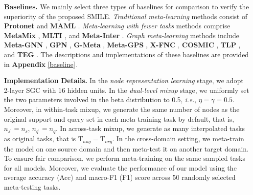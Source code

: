 \noindent \textbf{Baselines.} 
We mainly select three types of baselines for comparison to verify the superiority of the proposed SMILE. \textit{Traditional meta-learning} methods consist of \textbf{Protonet} \cite{snell2017prototypical} and \textbf{MAML} \cite{finn2017model}. \textit{Meta-learning with fewer tasks} methods comprise \textbf{MetaMix} \cite{yao2021improving}, \textbf{MLTI} \cite{yao2021meta}, and \textbf{Meta-Inter} \cite{lee2022set}. \textit{Graph meta-learning} methods include \textbf{Meta-GNN} \cite{zhou2019meta}, \textbf{GPN} \cite{ding2020graph}, \textbf{G-Meta} \cite{huang2020graph}, \textbf{Meta-GPS} \cite{liu2022few}, \textbf{X-FNC} \cite{wang2023few}, \textbf{COSMIC} \cite{wang2023contrastive}, \textbf{TLP} \cite{tan2022transductive}, and \textbf{TEG} \cite{kim2023task}. %
The descriptions and implementations of these baselines are provided in \textbf{Appendix} \ref{baseline}. 

\noindent \textbf{Implementation Details.} In the \textit{node representation learning} stage, we adopt 2-layer SGC with 16 hidden units. In the \textit{dual-level mixup} stage, we uniformly set the two parameters involved in the beta distribution to 0.5, \textit{i.e.}, $\eta\!=\!\gamma\!=\!0.5$. Moreover, in within-task mixup, we generate the same number of nodes as the original support and query set in each meta-training task by default, that is, $n_{s^\prime}\!=\!n_s$, $n_{q^\prime}=n_q$. In across-task mixup, we generate as many interpolated tasks as original tasks, that is $\mathrm{T}_{aug}\!=\!\mathrm{T}_{org}$. %
In the cross-domain setting, we meta-train the model on one source domain and then meta-test it on another target domain. To ensure fair comparison, we perform meta-training on the same sampled tasks for all models. %
Moreover, we evaluate the performance of our model using the average accuracy (Acc) and macro-F1 (F1) score across 50 randomly selected meta-testing tasks.